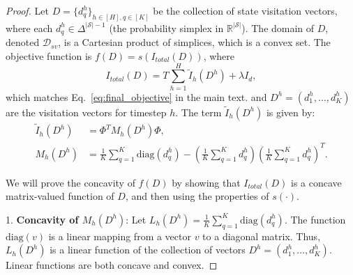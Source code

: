 \documentclass{article}
\newcommand{\mS}{\mathcal{S}}
\begin{document}
\begin{proof}
Let $D = \{d^h_q\}_{h \in [H], q \in [K]}$ be the collection of state visitation vectors, where each $d^h_q \in \Delta^{|\mS|-1}$ (the probability simplex in $\mathbb{R}^{|\mS|}$). The domain of $D$, denoted $\mathcal{D}_{sv}$, is a Cartesian product of simplices, which is a convex set.
The objective function is $f(D) = s(I_{total}(D))$, where
\[I_{total}(D) = T \sum_{h=1}^H \tilde{I}_h(D^h) + \lambda I_d,\]
which matches Eq.~\ref{eq:final_objective} in the main text.
and $D^h = (d^h_1, \dots, d^h_K)$ are the visitation vectors for timestep $h$. The term $\tilde{I}_h(D^h)$ is given by:
\begin{align*}
\tilde{I}_h(D^h) &= \Phi^T M_h(D^h) \Phi, \\
M_h(D^h) &= \frac{1}{K} \sum_{q=1}^K \mathrm{diag}(d^h_q)  - \left(\frac{1}{K}\sum_{q=1}^K d^h_q\right)
\left(\frac{1}{K}\sum_{q=1}^K d^h_q\right)^T.
\end{align*}

We will prove the concavity of $f(D)$ by showing that $I_{total}(D)$ is a concave matrix-valued function of $D$, and then using the properties of $s(\cdot)$.

1.  \textbf{Concavity of $M_h(D^h)$}:
    Let $L_h(D^h) = \frac{1}{K} \sum_{q=1}^K \mathrm{diag}(d^h_q)$. The function $\mathrm{diag}(v)$ is a linear mapping from a vector $v$ to a diagonal matrix. Thus, $L_h(D^h)$ is a linear function of the collection of vectors $D^h = (d^h_1, \dots, d^h_K)$. Linear functions are both concave and convex.


\end{proof}
\end{document}
